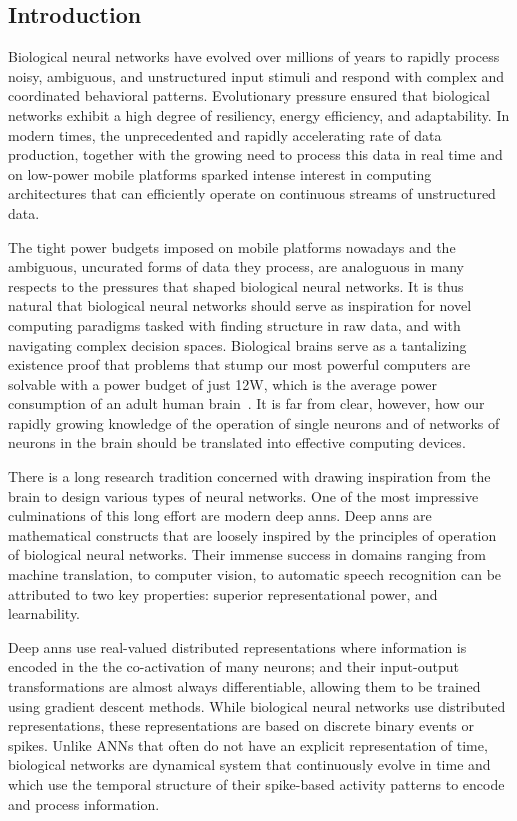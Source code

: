 
\subsection{Introduction}
Biological neural networks have evolved over millions of years to rapidly process noisy, ambiguous, and unstructured input stimuli and respond with complex and coordinated behavioral patterns. Evolutionary pressure ensured that biological networks exhibit a high degree of resiliency, energy efficiency, and adaptability. In modern times, the unprecedented and rapidly accelerating rate of data production, together with the growing need to process this data in real time and on low-power mobile platforms sparked intense interest in computing architectures that can efficiently operate on continuous streams of unstructured data.

The tight power budgets imposed on mobile platforms nowadays and the ambiguous, uncurated forms of data they process, are analoguous in many respects to the pressures that shaped biological neural networks. It is thus natural that biological neural networks should serve as inspiration for novel computing paradigms tasked with finding structure in raw data, and with navigating complex decision spaces. Biological brains serve as a tantalizing existence proof that problems that stump our most powerful computers are solvable with a power budget of just 12W, which is the average power consumption of an adult human brain~. It is far from clear, however, how our rapidly growing knowledge of the operation of single neurons and of networks of neurons in the brain should be translated into effective computing devices.

There is a long research tradition concerned with drawing inspiration from the brain to design various types of neural networks. One of the most impressive culminations of this long effort are modern deep \glspl{ann}. Deep \glspl{ann} are mathematical constructs that are loosely inspired by the principles of operation of biological neural networks. Their immense success in domains ranging from machine translation, to computer vision, to automatic speech recognition can be attributed to two key properties: superior representational power, and learnability. 

Deep \glspl{ann} use real-valued distributed representations where information is encoded in the the co-activation of many neurons; and their input-output transformations are almost always differentiable, allowing them to be trained using gradient descent methods. While biological neural networks use distributed representations, these representations are based on discrete binary events or spikes. Unlike ANNs that often do not have an explicit representation of time, biological networks are dynamical system that continuously evolve in time and which use the temporal structure of their spike-based activity patterns to encode and process information. 

